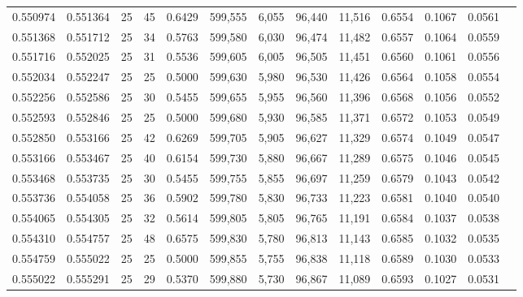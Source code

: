 \begin{tabular}{rrrrrrrrrrrrr}
0.550974 & 0.551364 &    25 &  45 &                                     0.6429 & 599,555 &   6,055 &  96,440 &  11,516 & 0.6554 & 0.1067 & 0.0561 \\
0.551368 & 0.551712 &    25 &  34 &                                     0.5763 & 599,580 &   6,030 &  96,474 &  11,482 & 0.6557 & 0.1064 & 0.0559 \\
0.551716 & 0.552025 &    25 &  31 &                                     0.5536 & 599,605 &   6,005 &  96,505 &  11,451 & 0.6560 & 0.1061 & 0.0556 \\
0.552034 & 0.552247 &    25 &  25 &                                     0.5000 & 599,630 &   5,980 &  96,530 &  11,426 & 0.6564 & 0.1058 & 0.0554 \\
0.552256 & 0.552586 &    25 &  30 &                                     0.5455 & 599,655 &   5,955 &  96,560 &  11,396 & 0.6568 & 0.1056 & 0.0552 \\
0.552593 & 0.552846 &    25 &  25 &                                     0.5000 & 599,680 &   5,930 &  96,585 &  11,371 & 0.6572 & 0.1053 & 0.0549 \\
0.552850 & 0.553166 &    25 &  42 &                                     0.6269 & 599,705 &   5,905 &  96,627 &  11,329 & 0.6574 & 0.1049 & 0.0547 \\
0.553166 & 0.553467 &    25 &  40 &                                     0.6154 & 599,730 &   5,880 &  96,667 &  11,289 & 0.6575 & 0.1046 & 0.0545 \\
0.553468 & 0.553735 &    25 &  30 &                                     0.5455 & 599,755 &   5,855 &  96,697 &  11,259 & 0.6579 & 0.1043 & 0.0542 \\
0.553736 & 0.554058 &    25 &  36 &                                     0.5902 & 599,780 &   5,830 &  96,733 &  11,223 & 0.6581 & 0.1040 & 0.0540 \\
0.554065 & 0.554305 &    25 &  32 &                                     0.5614 & 599,805 &   5,805 &  96,765 &  11,191 & 0.6584 & 0.1037 & 0.0538 \\
0.554310 & 0.554757 &    25 &  48 &                                     0.6575 & 599,830 &   5,780 &  96,813 &  11,143 & 0.6585 & 0.1032 & 0.0535 \\
0.554759 & 0.555022 &    25 &  25 &                                     0.5000 & 599,855 &   5,755 &  96,838 &  11,118 & 0.6589 & 0.1030 & 0.0533 \\
0.555022 & 0.555291 &    25 &  29 &                                     0.5370 & 599,880 &   5,730 &  96,867 &  11,089 & 0.6593 & 0.1027 & 0.0531 \\

\end{tabular}
